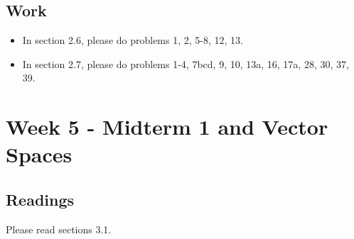 	\subsection{Work}
		\begin{itemize}
			\item In section 2.6, please do problems 1, 2, 5-8, 12, 13.
			\item In section 2.7, please do problems 1-4, 7bcd, 9, 10, 13a, 16, 17a, 28, 30, 37, 39.
		\end{itemize}

	\clearpage



	\section{Week 5 - Midterm 1 and Vector Spaces}

	\subsection{Readings}
		Please read sections 3.1.

